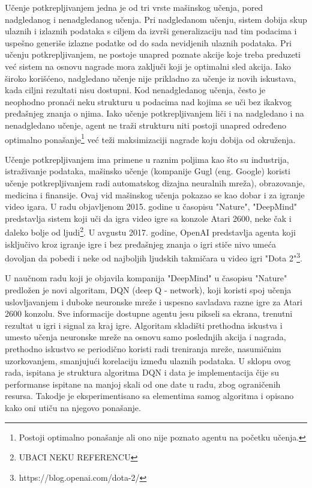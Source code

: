 Učenje potkrepljivanjem jedna je od tri vrste mašinskog učenja, pored nadgledanog i nenadgledanog učenja. Pri nadgledanom učenju, sistem dobija skup ulaznih i izlaznih podataka s ciljem da izvrši generalizaciju nad tim podacima i uspešno generiše izlazne podatke od do sada nevidjenih ulaznih podataka. Pri učenju potkrepljivanjem, ne postoje unapred poznate akcije koje treba preduzeti već sistem na osnovu nagrade mora zaključi koji je optimalni sled akcija. Iako široko korišćeno, nadgledano učenje nije prikladno za učenje iz novih iskustava, kada ciljni rezultati nisu dostupni.  Kod nenadgledanog učenja, često je neophodno pronaći neku strukturu u podacima nad kojima se uči bez ikakvog pređašnjeg znanja o njima. Iako učenje potkrepljivanjem liči i na nadgledano i na nenadgledano učenje, agent ne traži strukturu niti postoji unapred određeno optimalno ponašanje\footnote{Postoji optimalno ponašanje ali ono nije poznato agentu na početku učenja.} već teži maksimizaciji nagrade koju dobija od okruženja. \par


Učenje potkrepljivanjem ima primene u raznim poljima kao što su industrija, istraživanje podataka, mašinsko učenje (kompanije Gugl (eng. Google) koristi učenje potkrepljivanjem radi automatskog dizajna neuralnih mreža), obrazovanje, medicina i finansije. Ovaj vid mašinskog učenja pokazao se kao dobar i za igranje video igara.  U radu objavljenom 2015. godine u časopisu "Nature", "DeepMind" predstavlja sistem koji uči da igra video igre sa konzole Atari 2600, neke čak i daleko bolje od ljudi\footnote{UBACI NEKU REFERENCU}. U avgustu 2017. godine, OpenAI predstavlja agenta koji isključivo kroz igranje igre i bez pređašnjeg znanja o igri stiče nivo umeća dovoljan da pobedi i neke od najboljih ljudskih takmičara u video igri "Dota 2"\footnote{https://blog.openai.com/dota-2/}. 

U naučnom radu koji je objavila kompanija "DeepMind" u časopisu "Nature" predložen je novi algoritam, DQN (deep Q - network), koji koristi spoj učenja uslovljavanjem i duboke neuronske mreže i uspesno savladava razne igre za Atari 2600 konzolu. Sve informacije dostupne agentu jesu pikseli sa ekrana, trenutni rezultat u igri i signal za kraj igre. Algoritam skladišti prethodna iskustva i umesto učenja neuronske mreže na osnovu samo poslednjih akcija i nagrada, prethodno iskustvo se periodično koristi radi treniranja mreže, nasumičnim uzorkovanjem, smanjujući korelaciju između ulaznih podataka. 
U sklopu ovog rada, ispitana je struktura algoritma DQN i data je implementacija čije su performanse ispitane na manjoj skali od one date u radu, zbog ograničenih resursa. Takodje je eksperimentisano sa elementima samog algoritma i opisano kako oni utiču na njegovo ponašanje.


